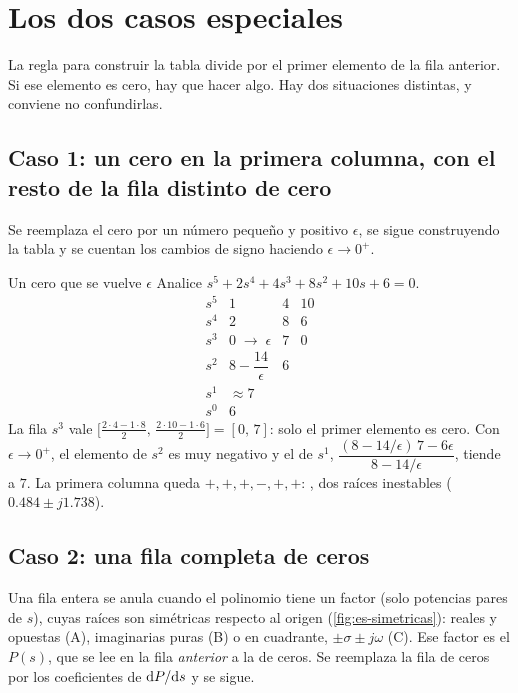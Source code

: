 \section{Los dos casos especiales}
\label{sec:es-casos}

La regla para construir la tabla divide por el primer elemento de la fila anterior. Si ese elemento es cero, hay que hacer algo. Hay dos situaciones distintas, y conviene no confundirlas.

\subsection*{Caso 1: un cero en la primera columna, con el resto de la fila distinto de cero}

Se reemplaza el cero por un número pequeño y positivo $\epsilon$, se sigue construyendo la tabla y se cuentan los cambios de signo haciendo $\epsilon\to0^+$.

\begin{ejemplo}[label=ej:es-caso1]{Un cero que se vuelve $\epsilon$}
Analice $s^5+2s^4+4s^3+8s^2+10s+6=0$.
\solucion
\[
\begin{array}{c|ccc}
  s^5 & 1 & 4 & 10\\
  s^4 & 2 & 8 & 6\\
  s^3 & 0\;\to\;\epsilon & 7 & 0\\
  s^2 & 8-\dfrac{14}{\epsilon} & 6\\[6pt]
  s^1 & \approx 7 & \\
  s^0 & 6
\end{array}
\]
La fila $s^3$ vale $\bigl[\frac{2\cdot4-1\cdot8}{2},\,\frac{2\cdot10-1\cdot6}{2}\bigr]=[0,\,7]$: solo el primer elemento es cero. Con $\epsilon\to0^+$, el elemento de $s^2$ es muy negativo y el de $s^1$, $\dfrac{(8-14/\epsilon)\,7-6\epsilon}{8-14/\epsilon}$, tiende a $7$. La primera columna queda $+,+,+,-,+,+$: , dos raíces inestables ($0.484\pm j1.738$).
\end{ejemplo}

\subsection*{Caso 2: una fila completa de ceros}

Una fila entera se anula cuando el polinomio tiene un factor  (solo potencias pares de $s$), cuyas raíces son simétricas respecto al origen (\cref{fig:es-simetricas}): reales y opuestas (A), imaginarias puras (B) o en cuadrante, $\pm\sigma\pm j\omega$ (C). Ese factor es el  $P(s)$, que se lee en la fila \emph{anterior} a la de ceros. Se reemplaza la fila de ceros por los coeficientes de $\mathrm{d} P/\mathrm{d} s$ y se sigue.

